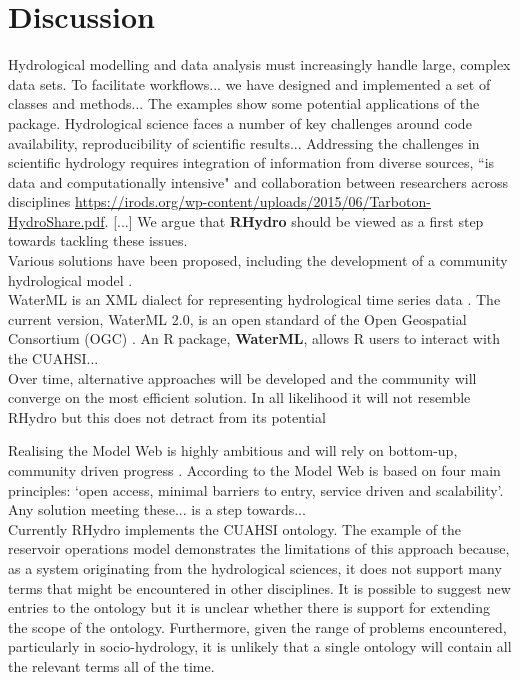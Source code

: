 \documentclass{icldt}\usepackage[]{graphicx}\usepackage[]{color}
\begin{document}
\section{Discussion}

Hydrological modelling and data analysis must increasingly handle large, complex data sets. To facilitate workflows... we have designed and implemented a set of classes and methods... The examples show some potential applications of the package. Hydrological science faces a number of key challenges around code availability, reproducibility of scientific results... Addressing the challenges in scientific hydrology requires integration of information from diverse sources, ``is data and computationally intensive" and collaboration between researchers across disciplines \url{https://irods.org/wp-content/uploads/2015/06/Tarboton-HydroShare.pdf}. [...] We argue that \textbf{RHydro} should be viewed as a first step towards tackling these issues. \\

Various solutions have been proposed, including the development of a community hydrological model \citep{weiler2015}. \\
WaterML is an XML dialect for representing hydrological time series data \citep{}. The current version, WaterML 2.0, is an open standard of the Open Geospatial Consortium (OGC) \citep{}. An R package, \textbf{WaterML}, allows R users to interact with the CUAHSI... \\

Over time, alternative approaches will be developed and the community will converge on the most efficient solution. In all likelihood it will not resemble RHydro but this does not detract from its potential  

Realising the Model Web is highly ambitious and will rely on bottom-up, community driven progress \citep{}. According to \citet{nativi2013} the Model Web is based on four main principles: `open access, minimal barriers to entry, service driven and scalability'. Any solution meeting these... is a step towards... \citet{nativi2013} \\

Currently RHydro implements the CUAHSI ontology. The example of the reservoir operations model demonstrates the limitations of this approach because, as a system originating from the hydrological sciences, it does not support many terms that might be encountered in other disciplines. It is possible to suggest new entries to the ontology but it is unclear whether there is support for extending the scope of the ontology. Furthermore, given the range of problems encountered, particularly in socio-hydrology, it is unlikely that a single ontology will contain all the relevant terms all of the time. \\
\end{document}
